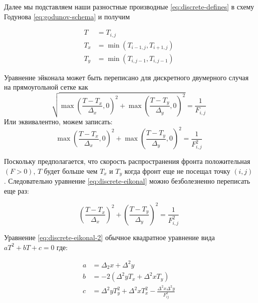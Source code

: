 

Далее мы подставляем наши разностные производные
\eqref{eq:discrete-defines} в схему Годунова \eqref{eq:godunov-schema}
и получим

\begin{equation}
  \begin{aligned}
  \label{eq:replaced}
    T &= T_{i,j}\\
    T_{x}&= \min(T_{i-1,j},T_{i+1,j})\\
    T_{y}&= \min(T_{i,j-1},T_{i,j-1})
      \end{aligned}
\end{equation}

Уравнение эйконала может быть переписано для дискретного двумерного
случая на прямоугольной сетке как
\begin{equation*}
  \sqrt{\max \left( \frac {T-T_{x}}{\Delta_x},0 \right)^2+  \max \left( \frac
  {T-T_{y}}{\Delta_y},0\right)^2} = \frac{1}{F_{i,j}}
\end{equation*}
Или эквивалентно, можем записать:
\begin{equation}
  \label{eq:discrete-eikonal}
  \max \left( \frac {T-T_{x}}{\Delta_x},0 \right)^2+  \max \left( \frac
      {T-T_{y}}{\Delta_y},0\right)^2 = \frac{1}{F_{i,j}^2}
\end{equation}

Поскольку предполагается, что скорость распространения фронта
положительная $(F>0)$, $T$ будет больше чем $T_x$ и $T_y$ когда фронт
еще не посещал точку $(i,j)$. Следовательно уравнение
\eqref{eq:discrete-eikonal} можно безболезненно переписать еще раз:

\begin{equation}
  \label{eq:discrete-eikonal-2}
  \left( \frac {T-T_{x}}{\Delta_x} \right)^2+
  \left( \frac {T-T_{y}}{\Delta_y} \right)^2 = \frac{1}{F_{i,j}^2}
\end{equation}

Уравнение \eqref{eq:discrete-eikonal-2} обычное квадратное уравнение
вида $aT^2+bT+c=0$ где:

\begin{equation}
  \begin{aligned}
  \label{eq:replaced}
    a &= \Delta_2 x + \Delta^2 y\\[0.4cm]
    b &= -2(\Delta^2y T_{x}+\Delta^2x T_{y})\\
    c &= \Delta^2 y T_{y}^2 + \Delta^2 x T_{x}^2 - \frac{\Delta^2 x
      \Delta^2 y}{F_{ij}^2}
    \end{aligned}
\end{equation}


